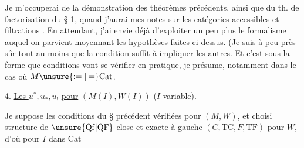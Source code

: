 
Je m'occuperai de la démonstration des théorèmes précédents, ainsi que du th. de factorisation du § 1, quand j'aurai mes notes sur les catégories  accessibles et filtrations . En attendant, j'ai envie déjà d'exploiter un peu plus le formalisme auquel on parvient moyennant les hypothèses faites ci-dessus. (Je suis à peu près sûr tout au moins que la condition  suffit à impliquer  les autres. Et c'est  sous la forme  que  conditions vont se vérifier en pratique, je présume, notamment dans le cas où $M\unsure{:=|=}\mathrm{Cat}$.

4. \uline{Les } $u^*,u_*,u_!$ \uline{pour} $(M(I),W(I))$ ($I$ variable).

Je suppose  les conditions du § précédent vérifiées pour $(M,W)$, et choisi  structure de $\unsure{\mathrm{Qf}|\mathrm{QF}}$ close et exacte à gauche $(C,\mathrm{TC},F,\mathrm{TF})$ pour $W$, d'où pour  $I$ dans $\mathrm{Cat}$
